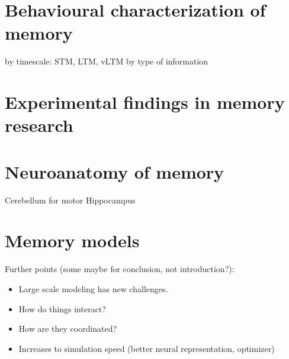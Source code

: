 \section{Behavioural characterization of memory}
by timescale: STM, LTM, vLTM
by type of information

\section{Experimental findings in memory research}

\section{Neuroanatomy of memory}
Cerebellum for motor
Hippocampus

\section{Memory models}

Further points (some maybe for conclusion, not introduction?):
\begin{itemize}
    \item Large scale modeling has new challenges.
    \item How do things interact?
    \item How are they coordinated?
    \item Increases to simulation speed (better neural representation, optimizer)
\end{itemize}
